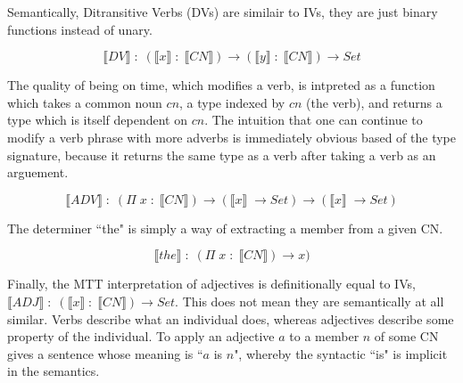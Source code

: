 Semantically, Ditransitive Verbs (DVs) are similair to IVs, they are just binary
functions instead of unary.

$$\llbracket DV \rrbracket\; {:}\; (\llbracket x \rrbracket\; {:}\; \llbracket
CN \rrbracket) \rightarrow (\llbracket y \rrbracket\; {:}\; \llbracket CN
\rrbracket) \rightarrow Set$$

The quality of being on time, which modifies a verb, is intpreted as a function
which takes a common noun $cn$, a type indexed by $cn$ (the verb), and returns a
type which is itself dependent on $cn$. The intuition that one can continue to
modify a verb phrase with more adverbs is immediately obvious based of the type
signature, because it returns the same type as a verb after taking a verb as an
arguement.

$$\llbracket ADV \rrbracket\; {:}\; (\Pi \; x \; {:}\;
\llbracket CN \rrbracket) \rightarrow (\llbracket x \rrbracket\; \rightarrow
Set) \rightarrow (\llbracket x \rrbracket\; \rightarrow Set)$$

The determiner ``the" is simply a way of extracting a member from a given CN.

$$\llbracket the \rrbracket\; {:}\; (\Pi \; x \; {:}\; \llbracket CN \rrbracket) \rightarrow x)$$

Finally, the MTT interpretation of adjectives is definitionally equal to IVs,
$\llbracket ADJ \rrbracket\; {:}\; (\llbracket x \rrbracket\; {:}\; \llbracket
CN \rrbracket) \rightarrow Set$. This does not mean they are semantically at all
similar. Verbs describe what an individual does, whereas adjectives describe
some property of the individual. To apply an adjective $a$ to a member $n$ of
some CN gives a sentence whose meaning is ``$a$ is $n$", whereby the syntactic
``is" is implicit in the semantics.

\begin{code}%
\>[0]\<%
\\
\>[0][@{}l@{\AgdaIndent{0}}]%
\>[2]\AgdaSpace{}%
\AgdaSymbol{:}\AgdaSpace{}%
\AgdaSpace{}%
\AgdaSpace{}%
\AgdaSpace{}%
\AgdaSpace{}%
\<%
\\
%
\>[2]\AgdaSpace{}%
\AgdaSymbol{:}\AgdaSpace{}%
\AgdaSymbol{(}\AgdaSpace{}%
\AgdaSymbol{:}\AgdaSpace{}%
\AgdaSymbol{)}\AgdaSpace{}%
\AgdaSpace{}%
\AgdaSymbol{(}\AgdaSpace{}%
\AgdaSpace{}%
\AgdaSymbol{)}\AgdaSpace{}%
\AgdaSpace{}%
\AgdaSymbol{(}\AgdaSpace{}%
\AgdaSpace{}%
\AgdaSymbol{)}\<%
\\
%
\>[2]\AgdaSpace{}%
\AgdaSymbol{:}\AgdaSpace{}%
\AgdaSymbol{(}\AgdaSpace{}%
\AgdaSymbol{:}\AgdaSpace{}%
\AgdaSymbol{)}\AgdaSpace{}%
%
\>[20]\<%
\\
%
\>[2]\AgdaSpace{}%
\AgdaSymbol{:}\AgdaSpace{}%
\AgdaSpace{}%
\AgdaSpace{}%
\<%
\end{code}

